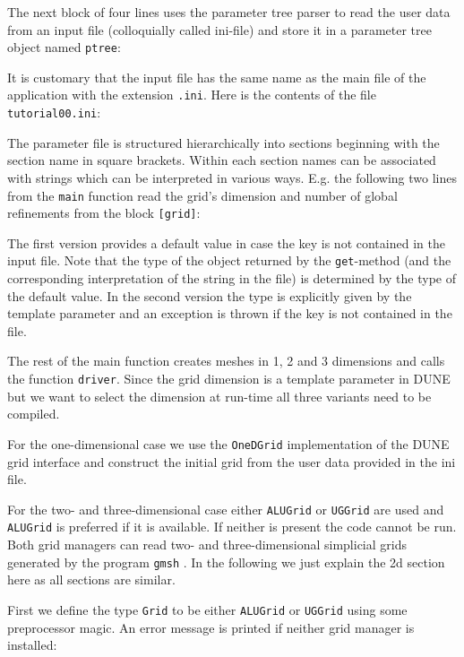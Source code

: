 \documentclass[a4paper,12pt]{article}
\begin{document}
The next block of four lines uses the parameter tree parser to
read the user data from an input file (colloquially called ini-file)
and store it in a parameter tree object
named \lstinline{ptree}:

It is customary that the input file has the same name as the 
main file of the application with the extension \lstinline{.ini}.
Here is the contents of the file \lstinline{tutorial00.ini}:

The parameter file is structured hierarchically into 
sections beginning with the section name in square brackets.
Within each section names can be associated with strings which
can be interpreted in various ways. 
E.g. the following two lines from the \lstinline{main} function read the grid's
dimension and number of global refinements from the block \lstinline{[grid]}:

The first version provides a default value in case the key is not
contained in the input file. Note that the type of the object returned by the 
\lstinline{get}-method (and the corresponding interpretation of the string in the
file) is determined by the type of the default value. In the second version
the type is explicitly given by the template parameter and an exception
is thrown if the key is not contained in the file.

The rest of the main function creates meshes in 1, 2 and 3 dimensions
and calls the function \lstinline{driver}. Since the grid dimension is a template
parameter in DUNE but we want to select the dimension at run-time all three variants
need to be compiled. 

For the one-dimensional case we use the \lstinline{OneDGrid} implementation
of the DUNE grid interface and construct the initial grid from the user data
provided in the ini file.

For the two- and three-dimensional case either \lstinline{ALUGrid} or
\lstinline{UGGrid} are used and \lstinline{ALUGrid} is preferred if it is available. 
If neither is present the code cannot be run.
Both grid managers can read two- and three-dimensional simplicial
grids generated by the program \lstinline{gmsh} \cite{NME:NME2579}.
In the following we just explain the 2d section here as all sections are similar.

First we define the type \lstinline{Grid} to be either
\lstinline{ALUGrid} or \lstinline{UGGrid} using some
preprocessor magic. An error message is printed if neither
grid manager is installed:

\end{document}
